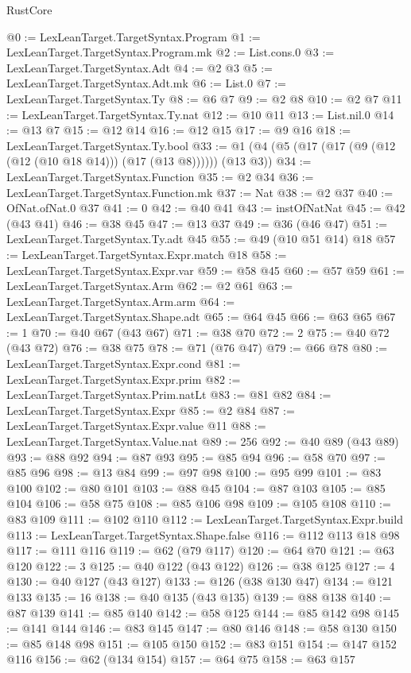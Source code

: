 \begin{lexlean}{RustCore}
\begin{coremodule}
@0 := LexLeanTarget.TargetSyntax.Program
@1 := LexLeanTarget.TargetSyntax.Program.mk
@2 := List.cons.{0}
@3 := LexLeanTarget.TargetSyntax.Adt
@4 := @2 @3
@5 := LexLeanTarget.TargetSyntax.Adt.mk
@6 := List.{0}
@7 := LexLeanTarget.TargetSyntax.Ty
@8 := @6 @7
@9 := @2 @8
@10 := @2 @7
@11 := LexLeanTarget.TargetSyntax.Ty.nat
@12 := @10 @11
@13 := List.nil.{0}
@14 := @13 @7
@15 := @12 @14
@16 := @12 @15
@17 := @9 @16
@18 := LexLeanTarget.TargetSyntax.Ty.bool
@33 := @1 (@4 (@5 (@17 (@17 (@9 (@12 (@12 (@10 @18 @14))) (@17 (@13 @8)))))) (@13 @3))
@34 := LexLeanTarget.TargetSyntax.Function
@35 := @2 @34
@36 := LexLeanTarget.TargetSyntax.Function.mk
@37 := Nat
@38 := @2 @37
@40 := OfNat.ofNat.{0} @37
@41 := 0
@42 := @40 @41
@43 := instOfNatNat
@45 := @42 (@43 @41)
@46 := @38 @45
@47 := @13 @37
@49 := @36 (@46 @47)
@51 := LexLeanTarget.TargetSyntax.Ty.adt @45
@55 := @49 (@10 @51 @14) @18
@57 := LexLeanTarget.TargetSyntax.Expr.match @18
@58 := LexLeanTarget.TargetSyntax.Expr.var
@59 := @58 @45
@60 := @57 @59
@61 := LexLeanTarget.TargetSyntax.Arm
@62 := @2 @61
@63 := LexLeanTarget.TargetSyntax.Arm.arm
@64 := LexLeanTarget.TargetSyntax.Shape.adt
@65 := @64 @45
@66 := @63 @65
@67 := 1
@70 := @40 @67 (@43 @67)
@71 := @38 @70
@72 := 2
@75 := @40 @72 (@43 @72)
@76 := @38 @75
@78 := @71 (@76 @47)
@79 := @66 @78
@80 := LexLeanTarget.TargetSyntax.Expr.cond
@81 := LexLeanTarget.TargetSyntax.Expr.prim
@82 := LexLeanTarget.TargetSyntax.Prim.natLt
@83 := @81 @82
@84 := LexLeanTarget.TargetSyntax.Expr
@85 := @2 @84
@87 := LexLeanTarget.TargetSyntax.Expr.value @11
@88 := LexLeanTarget.TargetSyntax.Value.nat
@89 := 256
@92 := @40 @89 (@43 @89)
@93 := @88 @92
@94 := @87 @93
@95 := @85 @94
@96 := @58 @70
@97 := @85 @96
@98 := @13 @84
@99 := @97 @98
@100 := @95 @99
@101 := @83 @100
@102 := @80 @101
@103 := @88 @45
@104 := @87 @103
@105 := @85 @104
@106 := @58 @75
@108 := @85 @106 @98
@109 := @105 @108
@110 := @83 @109
@111 := @102 @110
@112 := LexLeanTarget.TargetSyntax.Expr.build
@113 := LexLeanTarget.TargetSyntax.Shape.false
@116 := @112 @113 @18 @98
@117 := @111 @116
@119 := @62 (@79 @117)
@120 := @64 @70
@121 := @63 @120
@122 := 3
@125 := @40 @122 (@43 @122)
@126 := @38 @125
@127 := 4
@130 := @40 @127 (@43 @127)
@133 := @126 (@38 @130 @47)
@134 := @121 @133
@135 := 16
@138 := @40 @135 (@43 @135)
@139 := @88 @138
@140 := @87 @139
@141 := @85 @140
@142 := @58 @125
@144 := @85 @142 @98
@145 := @141 @144
@146 := @83 @145
@147 := @80 @146
@148 := @58 @130
@150 := @85 @148 @98
@151 := @105 @150
@152 := @83 @151
@154 := @147 @152 @116
@156 := @62 (@134 @154)
@157 := @64 @75
@158 := @63 @157

\end{coremodule}
\end{lexlean}
